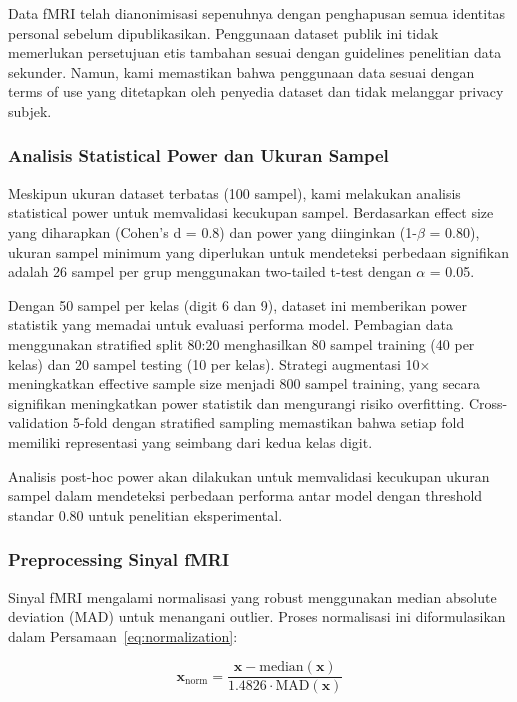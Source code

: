Data fMRI telah dianonimisasi sepenuhnya dengan penghapusan semua identitas personal sebelum dipublikasikan. Penggunaan dataset publik ini tidak memerlukan persetujuan etis tambahan sesuai dengan guidelines penelitian data sekunder. Namun, kami memastikan bahwa penggunaan data sesuai dengan terms of use yang ditetapkan oleh penyedia dataset dan tidak melanggar privacy subjek.

\subsubsection{Analisis Statistical Power dan Ukuran Sampel}
Meskipun ukuran dataset terbatas (100 sampel), kami melakukan analisis statistical power untuk memvalidasi kecukupan sampel. Berdasarkan effect size yang diharapkan (Cohen's d = 0.8) dan power yang diinginkan (1-$\beta$ = 0.80), ukuran sampel minimum yang diperlukan untuk mendeteksi perbedaan signifikan adalah 26 sampel per grup menggunakan two-tailed t-test dengan $\alpha$ = 0.05.

Dengan 50 sampel per kelas (digit 6 dan 9), dataset ini memberikan power statistik yang memadai untuk evaluasi performa model. Pembagian data menggunakan stratified split 80:20 menghasilkan 80 sampel training (40 per kelas) dan 20 sampel testing (10 per kelas). Strategi augmentasi 10× meningkatkan effective sample size menjadi 800 sampel training, yang secara signifikan meningkatkan power statistik dan mengurangi risiko overfitting. Cross-validation 5-fold dengan stratified sampling memastikan bahwa setiap fold memiliki representasi yang seimbang dari kedua kelas digit.

Analisis post-hoc power akan dilakukan untuk memvalidasi kecukupan ukuran sampel dalam mendeteksi perbedaan performa antar model dengan threshold standar 0.80 untuk penelitian eksperimental.

\subsubsection{Preprocessing Sinyal fMRI}
Sinyal fMRI mengalami normalisasi yang robust menggunakan median absolute deviation (MAD) untuk menangani outlier. Proses normalisasi ini diformulasikan dalam Persamaan~\ref{eq:normalization}:

\begin{equation}
\mathbf{x}_{\text{norm}} = \frac{\mathbf{x} - \text{median}(\mathbf{x})}{1.4826 \cdot \text{MAD}(\mathbf{x})}
\label{eq:normalization}
\end{equation}

